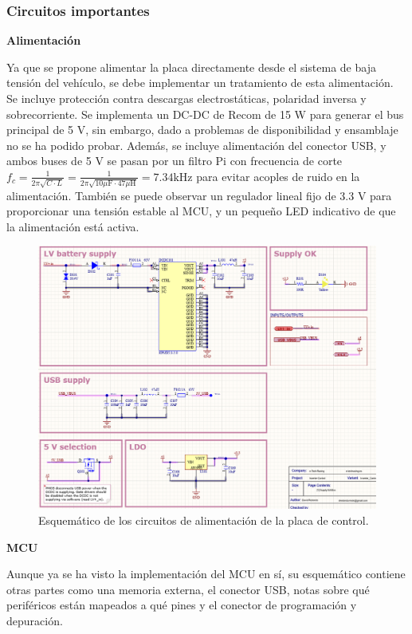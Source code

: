 \subsubsection{Circuitos importantes}

\textbf{Alimentación}

Ya que se propone alimentar la placa directamente desde el sistema de baja tensión del vehículo, se debe implementar un tratamiento de esta alimentación. Se incluye protección contra descargas electrostáticas, polaridad inversa y sobrecorriente. Se implementa un DC-DC de Recom de 15 W para generar el bus principal de 5 V, sin embargo, dado a problemas de disponibilidad y ensamblaje no se ha podido probar. Además, se incluye alimentación del conector USB, y ambos buses de 5 V se pasan por un filtro Pi con frecuencia de corte $f_c = \frac{1}{2 \pi \sqrt{C \cdot L}} = \frac{1}{2 \pi \sqrt{10\mu\text{F} \cdot 47\mu\text{H}}} = 7.34 \text{kHz}$ para evitar acoples de ruido en la alimentación. También se puede observar un regulador lineal fijo de 3.3 V para proporcionar una tensión estable al MCU, y un pequeño LED indicativo de que la alimentación está activa.

\begin{figure}[H]
	\centering
	\includegraphics[width=0.7\linewidth]{fig/schSUPPcontrol}
	\caption{Esquemático de los circuitos de alimentación de la placa de control.}
\end{figure}

\textbf{MCU}

Aunque ya se ha visto la implementación del MCU en sí, su esquemático contiene otras partes como una memoria externa, el conector USB, notas sobre qué periféricos están mapeados a qué pines y el conector de programación y depuración.


